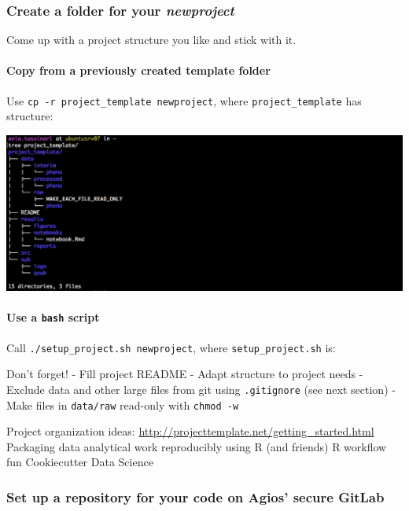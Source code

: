 \documentclass[openany]{article}
\let\oldparagraph\paragraph
\renewcommand{\paragraph}[1]{\oldparagraph{#1}\mbox{}}
\begin{document}
\hypertarget{create-a-folder-for-your-newproject}{%
\subsubsection{\texorpdfstring{Create a folder for your \emph{newproject}}{Create a folder for your newproject}}\label{create-a-folder-for-your-newproject}}

Come up with a project structure you like and stick with it.

\hypertarget{copy-from-a-previously-created-template-folder}{%
\paragraph{Copy from a previously created template folder}\label{copy-from-a-previously-created-template-folder}}

Use \texttt{cp\ -r\ project\_template\ newproject}, where \texttt{project\_template} has structure:

\includegraphics[width=0.8\linewidth]{images/projectstructure}

\hypertarget{use-a-bash-script}{%
\paragraph{\texorpdfstring{Use a \texttt{bash} script}{Use a bash script}}\label{use-a-bash-script}}

Call \texttt{./setup\_project.sh\ newproject}, where \texttt{setup\_project.sh} is:

Don't forget!
- Fill project README
- Adapt structure to project needs
- Exclude data and other large files from git using \texttt{.gitignore} (see next section)
- Make files in \texttt{data/raw} read-only with \texttt{chmod\ -w}

Project organization ideas:
\url{http://projecttemplate.net/getting_started.html}
Packaging data analytical work reproducibly using R (and friends)
R workflow fun
Cookiecutter Data Science

\hypertarget{set-up-a-repository-for-your-code-on-agios-secure-gitlab}{%
\subsubsection{Set up a repository for your code on Agios' secure GitLab}\label{set-up-a-repository-for-your-code-on-agios-secure-gitlab}}
\end{document}
